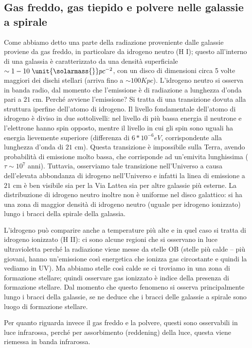 \subsection{Gas freddo, gas tiepido e polvere nelle galassie a spirale}
Come abbiamo detto una parte della radiazione proveniente dalle galassie proviene da gas freddo, in particolare da idrogeno neutro (H I); questo all'interno di una galassia è caratterizzato da una densità superficiale $\sim 1-10 \; \unit{\solarmass{}}pc^{-2}$, con un disco di dimensioni circa 5 volte maggiori dei dischi stellari (arriva fino a $\sim 100 Kpc$). L'idrogeno neutro si osserva in banda radio, dal momento che l'emissione è di radiazione a lunghezza d’onda pari a $21$ cm. Perché avviene l'emissione? Si tratta di una transizione dovuta alla struttura iperfine dell’atomo di idrogeno. Il livello fondamentale dell’atomo di idrogeno è diviso in due sottolivelli: nel livello di più bassa energia il neutrone e l’elettrone hanno spin opposto, mentre il livello in cui gli spin sono uguali ha energia lievemente superiore (differenza di $6*10^{-6}eV$, corrispondente alla lunghezza d’onda di $21$ cm). Questa transizione è impossibile sulla Terra, avendo probabilità di emissione molto bassa, che corrisponde ad un'emivita lunghissima ($\tau \sim 10^7$ anni). Tuttavia, osserviamo tale transizione nell’Universo a causa dell’elevata abbondanza di idrogeno nell’Universo e infatti la linea di emissione a $21$ cm è ben visibile sia per la Via Lattea sia per altre galassie più esterne. La distribuzione di idrogeno neutro inoltre non è uniforme nel disco galattico: si ha una zona di maggior densità di idrogeno neutro (uguale per idrogeno ionizzato) lungo i bracci della spirale della galassia. 

L'idrogeno può comparire anche a temperature più alte e in quel caso si tratta di idrogeno ionizzato (H II): ci sono alcune regioni che si osservano in luce ultravioletta perché la radiazione viene messe da stelle OB (stelle più calde – più giovani, hanno un'emissione così energetica che ionizza gas circostante e quindi la vediamo in UV). Ma abbiamo stelle così calde se ci troviamo in una zona di formazione stellare; quindi osservare gas ionizzato è indice della presenza di formazione stellare. Dal momento che questo fenomeno si osserva principalmente lungo i bracci della galassie, se ne deduce che i bracci delle galassie a spirale sono luogo di formazione stellare. 

Per quanto riguarda invece il gas freddo e la polvere, questi sono osservabili in luce infrarossa, perché per assorbimento (reddening) della luce, questa viene riemessa in banda infrarossa. 